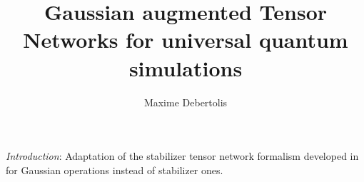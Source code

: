 \documentclass[a4paper, twocolumn, superscriptaddress, longbibliography]{revtex4-2}
\begin{document}
	\author{Maxime Debertolis}
	\title{Gaussian augmented Tensor Networks for universal quantum simulations}

	\begin{abstract}

	\end{abstract}

	\maketitle

	\emph{Introduction}: Adaptation of the stabilizer tensor network formalism developed in~\cite{Masot_Llima_2024} for Gaussian operations instead of stabilizer ones. \\
	
\end{document}
